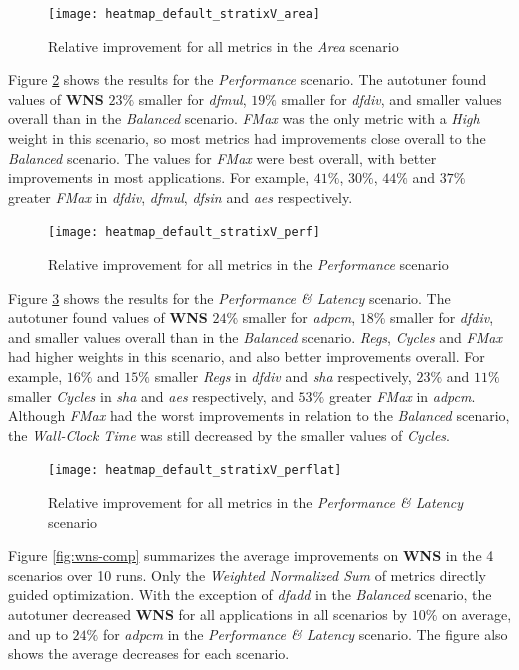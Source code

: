 \begin{figure}[htpb]
    \centering
    \texttt{[image: heatmap\_default\_stratixV\_area]}
    \caption{Relative improvement for all metrics in the \textit{Area} scenario}
    \label{fig:area}
\end{figure}

Figure \ref{fig:perf} shows the results for the \textit{Performance} scenario.
The autotuner found values of \textbf{WNS} $23\%$ smaller for \textit{dfmul},
$19\%$ smaller for \textit{dfdiv}, and smaller values overall than in the
\textit{Balanced} scenario.  \textit{FMax} was the only metric with a
\textit{High} weight in this scenario, so most metrics had improvements close
overall to the \textit{Balanced} scenario.  The values for \textit{FMax} were
best overall, with better improvements in most applications. For example,
$41\%$, $30\%$, $44\%$ and $37\%$ greater \textit{FMax} in \textit{dfdiv},
\textit{dfmul}, \textit{dfsin} and \textit{aes} respectively.

\begin{figure}[htpb]
    \centering
    \texttt{[image: heatmap\_default\_stratixV\_perf]}
    \caption{Relative improvement for all metrics in the \textit{Performance} scenario}
    \label{fig:perf}
\end{figure}

Figure \ref{fig:perflat} shows the results for the \textit{Performance \&
Latency} scenario.  The autotuner found values of \textbf{WNS} $24\%$ smaller
for \textit{adpcm}, $18\%$ smaller for \textit{dfdiv}, and smaller values
overall than in the \textit{Balanced} scenario. \textit{Regs}, \textit{Cycles}
and \textit{FMax} had higher weights in this scenario, and also better
improvements overall.  For example, $16\%$ and $15\%$ smaller \textit{Regs} in
\textit{dfdiv} and \textit{sha} respectively, $23\%$ and $11\%$ smaller
\textit{Cycles} in \textit{sha} and \textit{aes} respectively, and $53\%$
greater \textit{FMax} in \textit{adpcm}. Although \textit{FMax} had the worst
improvements in relation to the \textit{Balanced} scenario, the
\textit{Wall-Clock Time} was still decreased by the smaller values of
\textit{Cycles}.

\begin{figure}[htpb]
    \centering
    \texttt{[image: heatmap\_default\_stratixV\_perflat]}
    \caption{Relative improvement for all metrics in the \textit{Performance \& Latency} scenario}
    \label{fig:perflat}
\end{figure}

Figure \ref{fig:wns-comp} summarizes the average improvements on \textbf{WNS}
in the 4 scenarios over 10 runs. Only the \textit{Weighted Normalized Sum} of
metrics directly guided optimization. With the exception of \textit{dfadd} in
the \textit{Balanced} scenario, the autotuner decreased \textbf{WNS} for all
applications in all scenarios by $10\%$ on average, and up to $24\%$ for
\textit{adpcm} in the \textit{Performance \& Latency} scenario. The figure also
shows the average decreases for each scenario.

